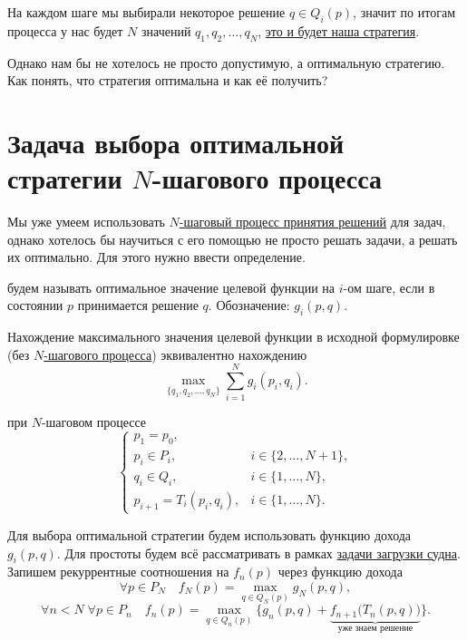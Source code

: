 На каждом шаге мы выбирали некоторое решение $q \in Q_i(p)$, значит по итогам процесса у нас будет $N$ значений $q_1, q_2, \dots, q_N$, \underline{это и будет наша стратегия}.

Однако нам бы не хотелось не просто допустимую, а оптимальную стратегию. Как понять, что стратегия оптимальна и как её получить?

\section{Задача выбора оптимальной стратегии $N$-шагового процесса}

Мы уже умеем использовать \hyperref[def:n_step_process]{$N$-шаговый процесс принятия решений} для задач, однако хотелось бы научиться с его помощью не просто решать задачи, а решать их оптимально. Для этого нужно ввести определение.


 будем называть оптимальное значение целевой функции на $i$-ом шаге, если в состоянии $p$ принимается решение $q$. Обозначение: $\boxed{g_i(p, q)}$.

\fact

Нахождение максимального значения целевой функции в исходной формулировке (без \hyperref[def:n_step_process]{$N$-шагового процесса}) эквивалентно нахождению
\[
\max_{\{q_1, q_2, \dots, q_N\}} \sum_{i=1}^{N} g_i(p_i, q_i).
\]

при $N$-шаговом процессе
\[
\begin{cases}
p_1 = p_0, \\	
p_i \in P_i, &i \in \{2, \dots, N+1\}, \\
q_i \in Q_i, &i \in \{1, \dots, N\}, \\
p_{i+1} = T_i(p_i, q_i), &i \in \{1, \dots, N\}.
\end{cases}
\]

\label{def:opt_strategy}

Для выбора оптимальной стратегии будем использовать функцию дохода $g_i(p, q)$. Для простоты будем всё рассматривать в рамках \hyperref[pr:loading_vessel]{задачи загрузки судна}. Запишем рекуррентные соотношения на $f_n(p)$ через функцию дохода
\[
\forall p \in P_{N} \quad f_N(p) = \max_{q \in Q_{N}(p)} g_N(p, q),
\]
\[
\forall n < N \; \forall p \in P_n \quad f_n(p) = \max_{q \in Q_{n}(p)} \Big\{g_n(p, q) + \underbrace{f_{n+1}\big(T_{n}(p, q)\big)}_{\text{уже знаем решение}}\Big\}.
\]

